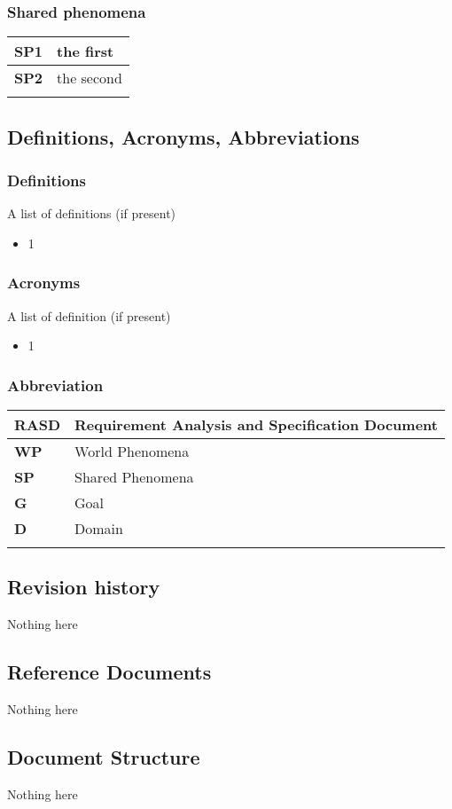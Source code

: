 \subsubsection*{Shared phenomena}
\begin{table}[h]
    \begin{tabular}{|l|l|}
        \toprule
        \textbf{SP1} & the first  \\ \midrule
        \textbf{SP2} & the second \\ \midrule
                     &            \\ \bottomrule
    \end{tabular}
\end{table}


\subsection{Definitions, Acronyms, Abbreviations}
\subsubsection*{Definitions}
A list of definitions (if present)
\begin{itemize}
    \item 1
\end{itemize}
\subsubsection*{Acronyms}
A list of definition (if present)
\begin{itemize}
    \item 1
\end{itemize}
\subsubsection*{Abbreviation}
\begin{table}[h]
    \begin{tabular}{|l|l|}
        \toprule
        \textbf{RASD} & Requirement Analysis and Specification Document \\ \midrule
        \textbf{WP}   & World Phenomena                                 \\ \midrule
        \textbf{SP}   & Shared Phenomena                                \\ \midrule
        \textbf{G}    & Goal                                            \\ \midrule
        \textbf{D}    & Domain                                          \\ \midrule
                      &                                                 \\ \bottomrule
    \end{tabular}
\end{table}
\subsection{Revision history}
Nothing here

\subsection{Reference Documents}
Nothing here

\subsection{Document Structure}
Nothing here
